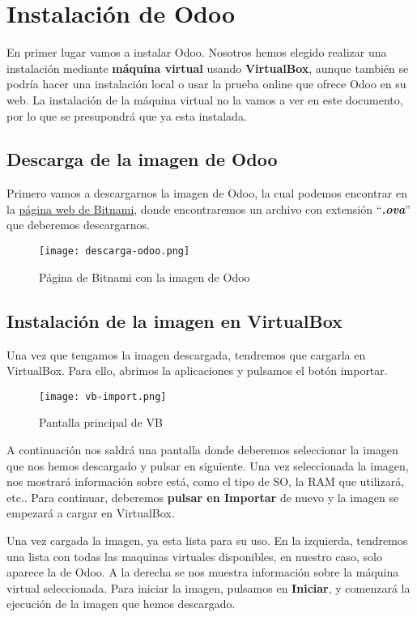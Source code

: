 \section{Instalación de Odoo}
En primer lugar vamos a instalar Odoo. Nosotros hemos elegido realizar una instalación mediante \textbf{máquina virtual} usando \textbf{VirtualBox}, aunque también se podría hacer una instalación local o usar la prueba online que ofrece Odoo en su web. La instalación de la máquina virtual no la vamos a ver en este documento, por lo que se presupondrá que ya esta instalada.

\subsection{Descarga de la imagen de Odoo}
Primero vamos a descargarnos la imagen de Odoo, la cual podemos encontrar en la \href{https://bitnami.com/stack/odoo/virtual-machine}{página web de Bitnami}, donde encontraremos un archivo con extensión ``\textbf{\textit{.ova}}'' que deberemos descargarnos.

\begin{figure}[h]
    \centering
    \texttt{[image: descarga-odoo.png]}
    \caption{Página de Bitnami con la imagen de Odoo}
\end{figure}


\subsection{Instalación de la imagen en VirtualBox}
Una vez que tengamos la imagen descargada, tendremos que cargarla en VirtualBox. Para ello, abrimos la aplicaciones y pulsamos el botón importar.

\begin{figure}[h]
    \centering
    \texttt{[image: vb-import.png]}
    \caption{Pantalla principal de VB}
\end{figure}

A continuación nos saldrá una pantalla donde deberemos seleccionar la imagen que nos hemos descargado y pulsar en siguiente. Una vez seleccionada la imagen, nos mostrará información sobre está, como el tipo de SO, la RAM que utilizará, etc.. Para continuar, deberemos \textbf{pulsar en Importar} de nuevo y la imagen se empezará a cargar en VirtualBox.

Una vez cargada la imagen, ya esta lista para su uso. En la izquierda, tendremos una lista con todas las maquinas virtuales disponibles, en nuestro caso, solo aparece la de Odoo. A la derecha se nos muestra información sobre la máquina virtual seleccionada. Para iniciar la imagen, pulsamos en \textbf{Iniciar}, y comenzará la ejecución de la imagen que hemos descargado.

